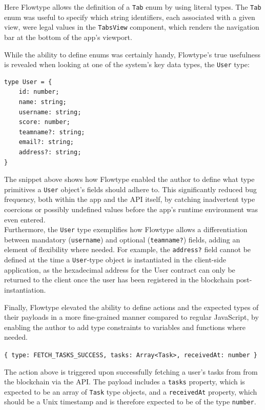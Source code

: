 \documentclass[12pt]{report}
\begin{document}
Here Flowtype allows the definition of a \texttt{Tab} enum by using
literal
types\cite{1flowtype}. The \texttt{Tab} enum was useful to specify which string
identifiers, each associated with a given view, were legal values in the
\texttt{TabsView} component, which renders the navigation bar at the
bottom of the app's viewport.

While the ability to define enums was certainly handy, Flowtype's true
usefulness is revealed when looking at one of the system's key data
types, the \texttt{User} type:

\begin{verbatim}
type User = {
    id: number;
    name: string;
    username: string;
    score: number;
    teamname?: string;
    email?: string;
    address?: string;
}
\end{verbatim}

The snippet above shows how Flowtype enabled the author to define what
type primitives a \texttt{User} object's fields should adhere to. This
significantly reduced bug frequency, both within the app and the API
itself, by catching inadvertent type coercions or possibly undefined
values before the app's runtime environment was even entered.\\
Furthermore, the \texttt{User} type exemplifies how Flowtype allows a
differentiation between mandatory (\texttt{username}) and optional
(\texttt{teamname?}) fields, adding an element of flexibility where
needed. For example, the \texttt{address?} field cannot be defined at
the time a \texttt{User}-type object is instantiated in the client-side
application, as the hexadecimal address for the User contract can only
be returned to the client once the user has been registered in the
blockchain post-instantiation.

Finally, Flowtype elevated the ability to define actions and the
expected types of their payloads in a more fine-grained manner compared
to regular JavaScript, by enabling the author to add type constraints to
variables and functions where needed.

\texttt{\{\ type:\ \textquotesingle{}FETCH\_TASKS\_SUCCESS\textquotesingle{},\ tasks:\ Array\textless{}Task\textgreater{},\ receivedAt:\ number\ \}}

The action above is triggered upon successfully fetching a user's tasks
from from the blockchain via the API. The payload includes a
\texttt{tasks} property, which is expected to be an array of
\texttt{Task} type objects, and a \texttt{receivedAt} property, which
should be a Unix timestamp and is therefore expected to be of the type
\texttt{number}.
\end{document}
